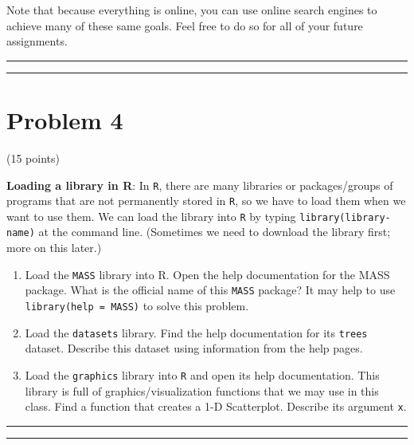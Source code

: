 \documentclass[]{article}
\providecommand{\tightlist}{%
  \setlength{\itemsep}{0pt}\setlength{\parskip}{0pt}}
\begin{document}
Note that because everything is online, you can use online search
engines to achieve many of these same goals. Feel free to do so for all
of your future assignments.

\begin{center}\rule{0.5\linewidth}{\linethickness}\end{center}

\begin{center}\rule{0.5\linewidth}{\linethickness}\end{center}

\hypertarget{problem-4}{%
\section{Problem 4}\label{problem-4}}

(15 points)

\textbf{Loading a library in R}: In \texttt{R}, there are many libraries
or packages/groups of programs that are not permanently stored in
\texttt{R}, so we have to load them when we want to use them. We can
load the library into \texttt{R} by typing
\texttt{library(library-name)} at the command line. (Sometimes we need
to download the library first; more on this later.)

\begin{enumerate}
\def\labelenumi{\alph{enumi}.}
\tightlist
\item
  Load the \texttt{MASS} library into R. Open the help documentation for
  the MASS package. What is the official name of this \texttt{MASS}
  package? It may help to use \texttt{library(help\ =\ MASS)} to solve
  this problem.
\item
  Load the \texttt{datasets} library. Find the help documentation for
  its \texttt{trees} dataset. Describe this dataset using information
  from the help pages.
\item
  Load the \texttt{graphics} library into \texttt{R} and open its help
  documentation. This library is full of graphics/visualization
  functions that we may use in this class. Find a function that creates
  a 1-D Scatterplot. Describe its argument \texttt{x}.
\end{enumerate}

\begin{center}\rule{0.5\linewidth}{\linethickness}\end{center}

\begin{center}\rule{0.5\linewidth}{\linethickness}\end{center}
\end{document}
